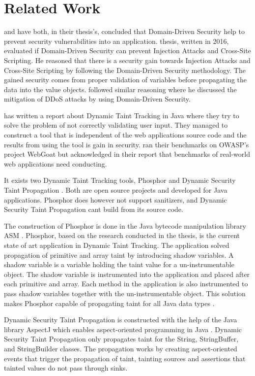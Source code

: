 \chapter{Related Work}
\textcite{Stendahl2016} and \textcite{Arnor2016} have both, in their thesis's, concluded that Domain-Driven Security help to prevent security vulnerabilities into an application. \textcite{Stendahl2016} thesis, written in 2016, evaluated if Domain-Driven Security can prevent Injection Attacks and Cross-Site Scripting. He reasoned that there is a security gain towards Injection Attacks and Cross-Site Scripting by following the Domain-Driven Security methodology. The gained security comes from proper validation of variables before propagating the data into the value objects. \textcite{Arnor2016} followed similar reasoning where he discussed the mitigation of DDoS attacks by using Domain-Driven Security.

\textcite{Haldar} has written a report about Dynamic Taint Tracking in Java where they try to solve the problem of not correctly validating user input. They managed to construct a tool that is independent of the web applications source code and the results from using the tool is gain in security. \textcite{Haldar} ran their benchmarks on OWASP’s project WebGoat \parencite{webgoat} but acknowledged in their report that benchmarks of real-world web applications need conducting.

It exists two Dynamic Taint Tracking tools, Phosphor \parencite{phosphor} and Dynamic Security Taint Propagation \parencite{securityTaint}. Both are open source projects and developed for Java applications. Phosphor does however not support sanitizers, and Dynamic Security Taint Propagation cant build from its source code.

The construction of Phosphor \parencite{phosphor} is done in the Java bytecode manipulation library ASM \parencite{asm}. Phosphor, based on the research conducted in the thesis, is the current state of art application in Dynamic Taint Tracking. The application solved propagation of primitive and array taint by introducing shadow variables. A shadow variable is a variable holding the taint value for a un-instrumentable object. The shadow variable is instrumented into the application and placed after each primitive and array. Each method in the application is also instrumented to pass shadow variables together with the un-instrumentable object. This solution makes Phosphor capable of propagating taint for all Java data types \parencite{BellJ.2014PIdd}.

Dynamic Security Taint Propagation \parencite{securityTaint} is constructed with the help of the Java library AspectJ which enables aspect-oriented programming in Java \parencite{aspectj}. Dynamic Security Taint Propagation only propagates taint for the String, StringBuffer, and StringBuilder classes. The propagation works by creating aspect-oriented events that trigger the propagation of taint, tainting sources and assertions that tainted values do not pass through sinks.